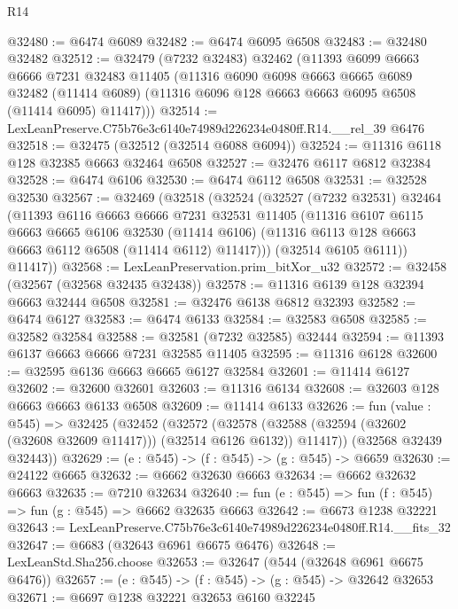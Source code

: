 \begin{lexlean}{R14}
\begin{coremodule}
@32480 := @6474 @6089
@32482 := @6474 @6095 @6508
@32483 := @32480 @32482
@32512 := @32479
    (@7232 @32483)
    @32462
    (@11393
      @6099
      @6663
      @6666
      @7231
      @32483
      @11405
      (@11316
        @6090
        @6098
        @6663
        @6665
        @6089
        @32482
        (@11414 @6089)
        (@11316 @6096 @128 @6663 @6663 @6095 @6508 (@11414 @6095) @11417)))
@32514 := LexLeanPreserve.C75b76e3c6140e74989d226234e0480ff.R14.__rel_39 @6476
@32518 := @32475 (@32512 (@32514 @6088 @6094))
@32524 := @11316 @6118 @128 @32385 @6663 @32464 @6508
@32527 := @32476 @6117 @6812 @32384
@32528 := @6474 @6106
@32530 := @6474 @6112 @6508
@32531 := @32528 @32530
@32567 := @32469
    (@32518
      (@32524
        (@32527
          (@7232 @32531)
          @32464
          (@11393
            @6116
            @6663
            @6666
            @7231
            @32531
            @11405
            (@11316
              @6107
              @6115
              @6663
              @6665
              @6106
              @32530
              (@11414 @6106)
              (@11316 @6113 @128 @6663 @6663 @6112 @6508 (@11414 @6112) @11417)))
          (@32514 @6105 @6111))
        @11417))
@32568 := LexLeanPreservation.prim_bitXor_u32
@32572 := @32458 (@32567 (@32568 @32435 @32438))
@32578 := @11316 @6139 @128 @32394 @6663 @32444 @6508
@32581 := @32476 @6138 @6812 @32393
@32582 := @6474 @6127
@32583 := @6474 @6133
@32584 := @32583 @6508
@32585 := @32582 @32584
@32588 := @32581 (@7232 @32585) @32444
@32594 := @11393 @6137 @6663 @6666 @7231 @32585 @11405
@32595 := @11316 @6128
@32600 := @32595 @6136 @6663 @6665 @6127 @32584
@32601 := @11414 @6127
@32602 := @32600 @32601
@32603 := @11316 @6134
@32608 := @32603 @128 @6663 @6663 @6133 @6508
@32609 := @11414 @6133
@32626 := fun (value : @545) =>
  @32425
    (@32452
      (@32572
        (@32578 (@32588 (@32594 (@32602 (@32608 @32609 @11417))) (@32514 @6126 @6132)) @11417))
      (@32568 @32439 @32443))
@32629 := (e : @545) -> (f : @545) -> (g : @545) -> @6659
@32630 := @24122 @6665
@32632 := @6662 @32630 @6663
@32634 := @6662 @32632 @6663
@32635 := @7210 @32634
@32640 := fun (e : @545) => fun (f : @545) => fun (g : @545) => @6662 @32635 @6663
@32642 := @6673 @1238 @32221
@32643 := LexLeanPreserve.C75b76e3c6140e74989d226234e0480ff.R14.__fits_32
@32647 := @6683 (@32643 @6961 @6675 @6476)
@32648 := LexLeanStd.Sha256.choose
@32653 := @32647 (@544 (@32648 @6961 @6675 @6476))
@32657 := (e : @545) -> (f : @545) -> (g : @545) -> @32642 @32653
@32671 := @6697
    @1238
    @32221
    @32653
    @6160
    @32245

\end{coremodule}
\end{lexlean}
